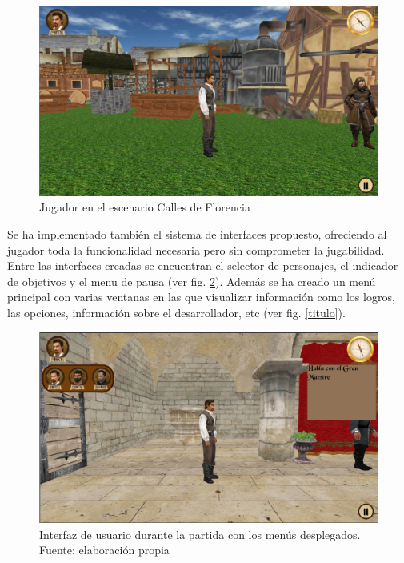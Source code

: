 \begin{figure}
\begin{center}
\includegraphics[scale=0.5]{imagenes/escenarios.png}
\caption{Jugador en el escenario Calles de Florencia}
\label{escenarios}
\end{center}
\end{figure}

Se ha implementado también el sistema de interfaces propuesto, ofreciendo al jugador  toda la funcionalidad necesaria pero sin comprometer la jugabilidad. Entre las interfaces creadas se encuentran  el selector de personajes, el indicador de objetivos y el menu de pausa (ver fig. \ref{iu}). Además se ha creado un menú principal con varias ventanas en las que visualizar información como los logros, las opciones, información sobre el desarrollador, etc (ver fig. \ref{titulo}).

\begin{figure}
\begin{center}
\includegraphics[scale=0.5]{imagenes/iu.png}
\caption{Interfaz de usuario durante la partida con los menús desplegados.  Fuente: elaboración propia}
\label{iu}
\end{center}
\end{figure}

